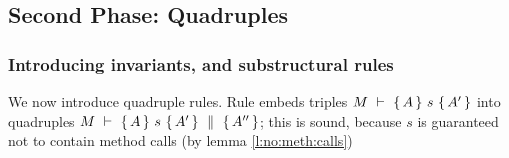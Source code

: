 

\subsection{Second Phase: Quadruples}
\label{s:hoare:second}

\subsubsection{Introducing invariants, and substructural rules}
We now introduce  quadruple rules. %
Rule {} embeds  triples  ${M\ \vdash\ \{\,A\, \} \ s\  \{\,A'\, \} }$  into quadruples ${M\ \vdash\ \{\,A\, \} \ s\  \{\,A'\, \}\, \,\parallel\,\, \{\, A'' \, \} }$; this is sound, because $s$ is guaranteed not to contain method calls (by lemma \ref{l:no:meth:calls})

